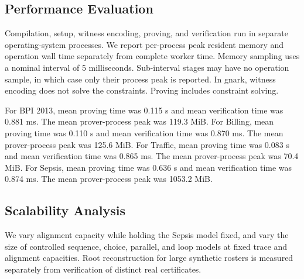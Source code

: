 \subsection{Performance Evaluation}

Compilation, setup, witness encoding, proving, and verification run in separate operating-system processes. We report per-process peak resident memory and operation wall time separately from complete worker time. Memory sampling uses a nominal interval of 5 milliseconds. Sub-interval stages may have no operation sample, in which case only their process peak is reported. In gnark, witness encoding does not solve the constraints. Proving includes constraint solving.

For BPI 2013, mean proving time was 0.115 s and mean verification time was 0.881 ms. The mean prover-process peak was 119.3 MiB. For Billing, mean proving time was 0.110 s and mean verification time was 0.870 ms. The mean prover-process peak was 125.6 MiB. For Traffic, mean proving time was 0.083 s and mean verification time was 0.865 ms. The mean prover-process peak was 70.4 MiB. For Sepsis, mean proving time was 0.636 s and mean verification time was 0.874 ms. The mean prover-process peak was 1053.2 MiB.

\subsection{Scalability Analysis}

We vary alignment capacity while holding the Sepsis model fixed, and vary the size of controlled sequence, choice, parallel, and loop models at fixed trace and alignment capacities. Root reconstruction for large synthetic rosters is measured separately from verification of distinct real certificates.
